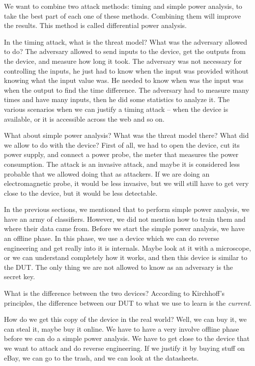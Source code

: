 We want to combine two attack methods: timing and simple power analysis, to take the best part of each one of these methods.
Combining them will improve the results.
This method is called differential power analysis.

In the timing attack, what is the threat model? 
What was the adversary allowed to do? 
The adversary allowed to send inputs to the device, 
get the outputs from the device, 
and measure how long it took.
The adversary was not necessary for controlling the inputs, 
he just had to know when the input was provided without knowing what the input value was.
He needed to know when was the input was when the output to find the time difference. 
The adversary had to measure many times and have many inputs, 
then he did some statistics to analyze it.
The various scenarios when we can justify a timing attack – when the device is available, or it is accessible across the web and so on.

What about simple power analysis? 
What was the threat model there? 
What did we allow to do with the device? 
First of all, we had to open the device, cut its power supply, and connect a power probe, the meter that measures the power consumption.
The attack is an invasive attack, and maybe it is considered less probable that we allowed doing that as attackers. 
If we are doing an electromagnetic probe, it would be less invasive, but we will still have to get very close to the device, but it would be less detectable. 

In the previous sections, we mentioned that to perform simple power analysis, we have an army of classifiers.
However, we did not mention how to train them and where their data came from.
Before we start the simple power analysis, we have an offline phase.
In this phase, we use a device which we can do reverse engineering and get really into it is internals. 
Maybe look at it with a microscope, or we can understand completely how it works, and then this device is similar to the DUT. 
The only thing we are not allowed to know as an adversary is the secret key.

What is the difference between the two devices? 
According to Kirchhoff's principles, the difference between our DUT to what we use to learn is the \textit{current}. 
  
How do we get this copy of the device in the real world?
Well, we can buy it, we can steal it, maybe buy it online. 
We have to have a very involve offline phase before we can do a simple power analysis.
We have to get close to the device that we want to attack and do reverse engineering.
If we justify it by buying stuff on eBay, we can go to the trash, and we can look at the datasheets.

